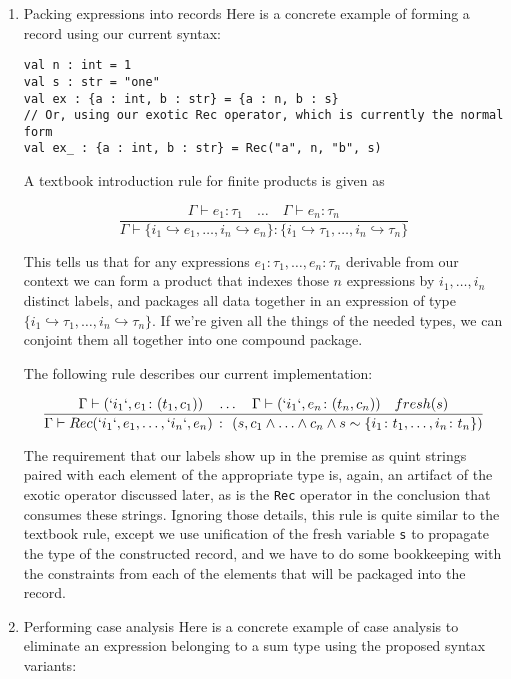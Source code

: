 \documentclass[11pt]{article}
\begin{document}
\begin{enumerate}
\item Packing expressions into records
\label{sec:org254ef28}
Here is a concrete example of forming a record using our current syntax:

\begin{verbatim}
val n : int = 1
val s : str = "one"
val ex : {a : int, b : str} = {a : n, b : s}
// Or, using our exotic Rec operator, which is currently the normal form
val ex_ : {a : int, b : str} = Rec("a", n, "b", s)
\end{verbatim}

A textbook introduction rule for finite products is given as

$$
\frac
{ \Gamma \vdash e_1 \colon \tau_1 \quad \ldots \quad \Gamma \vdash e_n \colon \tau_n }
{ \Gamma \vdash \{ i_1 \hookrightarrow e_1, \ldots, i_n \hookrightarrow e_n \} \colon \{ i_1 \hookrightarrow \tau_1, \ldots, i_n \hookrightarrow \tau_n \} }
$$

This tells us that for any expressions
\(e_1 : \tau_1, \ldots, e_n : \tau_n\) derivable from our context we can
form a product that indexes those \(n\) expressions by
\(i_1, \ldots, i_n\) distinct labels, and packages all data together in
an expression of type
\(\{ i_1 \hookrightarrow \tau_1, \ldots, i_n \hookrightarrow \tau_n \}\).
If we're given all the things of the needed types, we can conjoint them
all together into one compound package.

The following rule describes our current implementation:

$$
\frac
{ \Gamma \vdash (`i_1`, e_1 \colon (t_1, c_1)) \quad \ldots \quad \Gamma \vdash (`i_1`, e_n \colon (t_n, c_n)) \quad fresh(s) }
{ \Gamma \vdash Rec(`i_1`, e_1, \ldots, `i_n`, e_n) \ \colon \ (s, c_1 \land \ldots \land c_n \land s \sim \{ i_1 \colon t_1, \ldots, i_n \colon t_n \}) }
$$

The requirement that our labels show up in the premise as quint strings
paired with each element of the appropriate type is, again, an artifact
of the exotic operator discussed later, as is the \texttt{Rec} operator in the
conclusion that consumes these strings. Ignoring those details, this
rule is quite similar to the textbook rule, except we use unification of
the fresh variable \texttt{s} to propagate the type of the constructed record,
and we have to do some bookkeeping with the constraints from each of the
elements that will be packaged into the record.

\item Performing case analysis
\label{sec:org0e6979d}
Here is a concrete example of case analysis to eliminate an expression
belonging to a sum type using the proposed syntax variants:


\end{enumerate}
\end{document}
